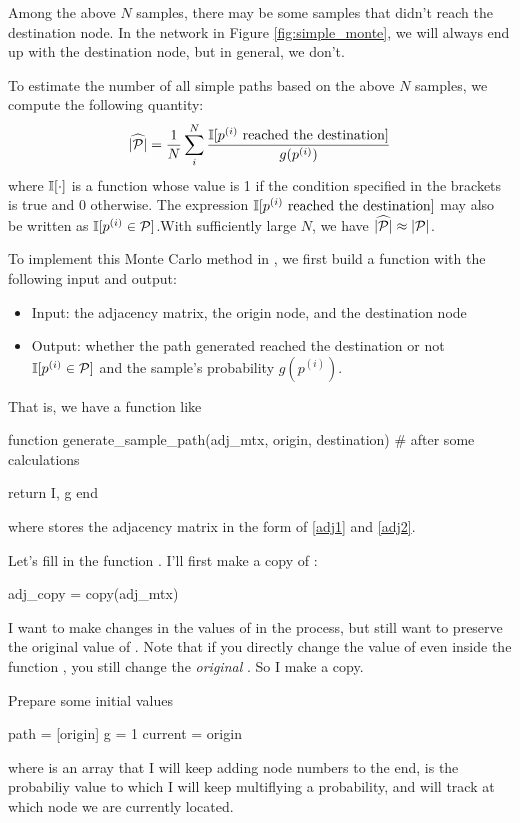 Among the above $N$ samples, there may be some samples that didn't reach the destination node. In the network in Figure \ref{fig:simple_monte}, we will always end up with the destination node, but in general, we don't.

To estimate the number of all simple paths based on the above $N$ samples, we compute the following quantity:
\[
    \widehat{|\mathcal{P}|} = \frac{1}{N} \sum_{i}^N \frac{\mathbb{I} [ p^{(i)} \text{ reached the destination} ] }{g(p^{(i)})}
\]
where $\mathbb{I}[\cdot]$ is a function whose value is 1 if the condition specified in the brackets is true and 0 otherwise. The expression $\mathbb{I} [ p^{(i)} \text{ reached the destination} ]$ may also be written as $\mathbb{I}[p^{(i)}\in\mathcal{P}]$.With sufficiently large $N$, we have $\widehat{|\mathcal{P}|} \approx |\mathcal{P}|$.

To implement this Monte Carlo method in \julia{}, we first build a function with the following input and output:
\begin{itemize}
\item Input: the adjacency matrix, the origin node, and the destination node
\item Output: whether the path generated reached the destination or not $\mathbb{I}[p^{(i)}\in\mathcal{P}]$ and the sample's probability $g(p^{(i)})$.
\end{itemize}
That is, we have a function like
\begin{code}
function generate_sample_path(adj_mtx, origin, destination)
    # after some calculations

    return  I, g
end
\end{code}
\noindent where  stores the adjacency matrix in the form of \eqref{adj1} and \eqref{adj2}.

Let's fill in the function . I'll first make a copy of :
\begin{code}
adj_copy = copy(adj_mtx)
\end{code}
\noindent I want to make changes in the values of  in the process, but still want to preserve the original value of . Note that if you directly change the value of  even inside the function , you still change the \emph{original} . So I make a copy.

Prepare some initial values
\begin{code}
path = [origin]
g = 1
current = origin
\end{code}
\noindent where  is an array that I will keep adding node numbers to the end,  is the probabiliy value to which I will keep multiflying a probability, and  will track at which node we are currently located.

